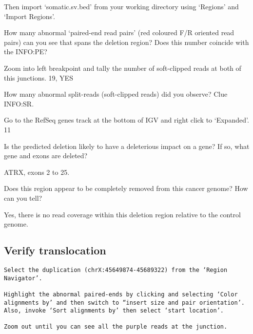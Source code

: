 \begin{steps}
\begin{information}
Then import ‘somatic.sv.bed’ from your working directory using ‘Regions’ and ‘Import Regions’. 

\end{information}


\begin{questions}
How many abnormal ‘paired-end read pairs’ (red coloured F/R oriented read pairs) can you see that spans the deletion region? Does this number coincide with the INFO:PE? 
\begin{answer}
Zoom into left breakpoint and tally the number of soft-clipped reads at both of this junctions.
19, YES
\end{answer}

How many abnormal split-reads (soft-clipped reads) did you observe? Clue INFO:SR.
\begin{answer}
Go to the RefSeq genes track at the bottom of IGV and right click to ‘Expanded’.
11
\end{answer}
Is the predicted deletion likely to have a deleterious impact on a gene? If so, what gene and exons are deleted?
\begin{answer}
ATRX, exons 2 to 25.
\end{answer}
Does this region appear to be completely removed from this cancer genome? How can you tell?
\begin{answer}
Yes, there is no read coverage within this deletion region relative to the control genome. 
\end{answer}
\end{questions}




\subsection{Verify translocation}
\begin{advanced}

\begin{lstlisting}
Select the duplication (chrX:45649874-45689322) from the ‘Region Navigator’. 

Highlight the abnormal paired-ends by clicking and selecting ‘Color alignments by’ and then switch to “insert size and pair orientation’. Also, invoke ‘Sort alignments by’ then select ‘start location’.

Zoom out until you can see all the purple reads at the junction.
\end{lstlisting}
\end{advanced}



\end{steps}
